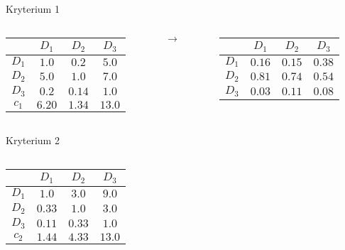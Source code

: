 \documentclass{beamer}
\begin{document}
\begin{frame}[allowframebreaks]
	Kryterium 1
	\begin{columns}
		\begin{column}{0.4\textwidth}
			\begin{table}
				\begin{tabular}{c|c|c|c}
					&	$D_1$	&	$D_2$	&	$D_3$\\ \hline
				$D_1$	&	$1.0$	&	$0.2$	&	$5.0$\\ \hline
				$D_2$	&	$5.0$	&	$1.0$	&	$7.0$\\ \hline
				$D_3$	&	$0.2$	&	$0.14$	&	$1.0$\\ \hline\hline
				$c_1$	&	$6.20$	&	$1.34$	&	$13.0$
				\end{tabular}
			\end{table}
		\end{column}
		\begin{column}{0.1\textwidth}
			$\rightarrow$
		\end{column}
		\begin{column}{0.4\textwidth}
			\begin{table}
				\begin{tabular}{c|c|c|c}
					&	$D_1$	&	$D_2$	&	$D_3$\\ \hline
				$D_1$	&	$0.16$	&	$0.15$	&	$0.38$\\ \hline
				$D_2$	&	$0.81$	&	$0.74$	&	$0.54$\\ \hline
				$D_3$	&	$0.03$	&	$0.11$	&	$0.08$
				\end{tabular}
			\end{table}
		\end{column}
	\end{columns}
	Kryterium 2
	\begin{columns}
		\begin{column}{0.4\textwidth}
			\begin{table}
				\begin{tabular}{c|c|c|c}
					&	$D_1$	&	$D_2$	&	$D_3$\\ \hline
				$D_1$	&	$1.0$	&	$3.0$	&	$9.0$\\ \hline
				$D_2$	&	$0.33$	&	$1.0$	&	$3.0$\\ \hline
				$D_3$	&	$0.11$	&	$0.33$	&	$1.0$\\ \hline\hline
				$c_2$	&	$1.44$	&	$4.33$	&	$13.0$
				\end{tabular}
			\end{table}
		\end{column}
		\begin{column}{0.1\textwidth}

\end{column}
\end{columns}
\end{frame}
\end{document}
